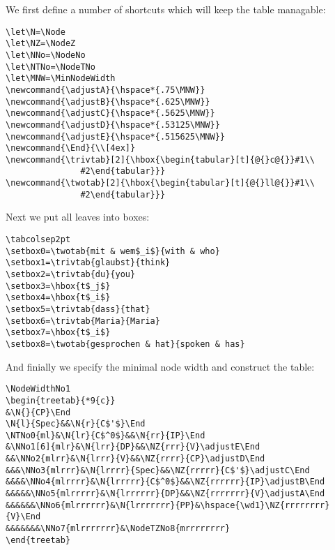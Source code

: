 \documentclass{article}
\begin{document}
We first define a number of shortcuts which will keep the table 
managable:
\begin{verbatim}
\let\N=\Node
\let\NZ=\NodeZ
\let\NNo=\NodeNo
\let\NTNo=\NodeTNo
\let\MNW=\MinNodeWidth
\newcommand{\adjustA}{\hspace*{.75\MNW}}
\newcommand{\adjustB}{\hspace*{.625\MNW}}
\newcommand{\adjustC}{\hspace*{.5625\MNW}}
\newcommand{\adjustD}{\hspace*{.53125\MNW}}
\newcommand{\adjustE}{\hspace*{.515625\MNW}}
\newcommand{\End}{\\[4ex]}
\newcommand{\trivtab}[2]{\hbox{\begin{tabular}[t]{@{}c@{}}#1\\
               #2\end{tabular}}}
\newcommand{\twotab}[2]{\hbox{\begin{tabular}[t]{@{}ll@{}}#1\\
               #2\end{tabular}}}
\end{verbatim}
%
Next we put all leaves into boxes:
\begin{verbatim}
\tabcolsep2pt
\setbox0=\twotab{mit & wem$_i$}{with & who}
\setbox1=\trivtab{glaubst}{think}
\setbox2=\trivtab{du}{you}
\setbox3=\hbox{t$_j$}
\setbox4=\hbox{t$_i$}
\setbox5=\trivtab{dass}{that}
\setbox6=\trivtab{Maria}{Maria} 
\setbox7=\hbox{t$_i$}
\setbox8=\twotab{gesprochen & hat}{spoken & has}
\end{verbatim}
And finially we specify the minimal node width and construct the table:
\begin{small}\begin{verbatim}
\NodeWidthNo1
\begin{treetab}{*9{c}}
&\N{}{CP}\End
\N{l}{Spec}&&\N{r}{C$'$}\End 
\NTNo0{ml}&\N{lr}{C$^0$}&&\N{rr}{IP}\End
&\NNo1[6]{mlr}&\N{lrr}{DP}&&\NZ{rrr}{V}\adjustE\End
&&\NNo2{mlrr}&\N{lrrr}{V}&&\NZ{rrrr}{CP}\adjustD\End
&&&\NNo3{mlrrr}&\N{lrrrr}{Spec}&&\NZ{rrrrr}{C$'$}\adjustC\End
&&&&\NNo4{mlrrrr}&\N{lrrrrr}{C$^0$}&&\NZ{rrrrrr}{IP}\adjustB\End
&&&&&\NNo5{mlrrrrr}&\N{lrrrrrr}{DP}&&\NZ{rrrrrrr}{V}\adjustA\End
&&&&&&\NNo6{mlrrrrrr}&\N{lrrrrrrr}{PP}&\hspace{\wd1}\NZ{rrrrrrrr}{V}\End
&&&&&&&\NNo7{mlrrrrrrr}&\NodeTZNo8{mrrrrrrrr}
\end{treetab}
\end{verbatim}\end{small}
\end{document}
